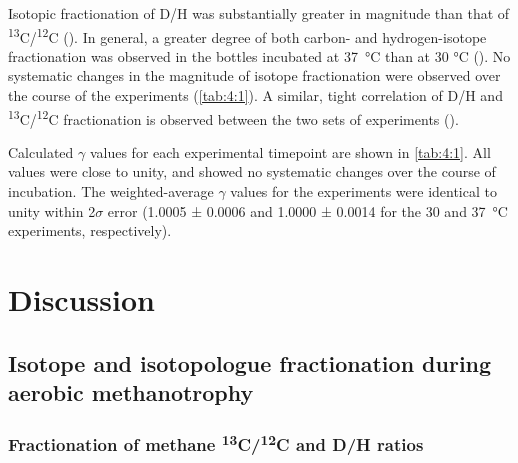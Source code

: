 Isotopic fractionation of D/H was substantially greater in magnitude
than that of \textsuperscript{13}C/\textsuperscript{12}C (). In
general, a greater degree of both carbon- and hydrogen-isotope
fractionation was observed in the bottles incubated at 37~°C than at 30
°C (). No systematic changes in the magnitude of isotope
fractionation were observed over the course of the experiments (\autoref{tab:4:1}). A similar, tight correlation of D/H and
\textsuperscript{13}C/\textsuperscript{12}C fractionation is observed
between the two sets of experiments ().

Calculated $\gamma$ values for each experimental timepoint are shown in \autoref{tab:4:1}. All values were close to unity, and showed no systematic changes over
the course of incubation. The weighted-average $\gamma$ values for the
experiments were identical to unity within 2$\sigma$ error (1.0005 ± 0.0006 and
1.0000 ± 0.0014 for the 30 and 37~°C experiments, respectively).

\section{Discussion}\label{sec:4:discussion}

\subsection{Isotope and isotopologue fractionation during aerobic
	methanotrophy}\label{sec:4:isotope-and-isotopologue-fractionation-during-aerobic-methanotrophy}

\subsubsection{\texorpdfstring{Fractionation of methane
		\textsuperscript{13}C/\textsuperscript{12}C and D/H
		ratios}{Fractionation of methane 13C/12C and D/H ratios}}\label{sec:4:fractionation-of-methane-13c12c-and-dh-ratios}


